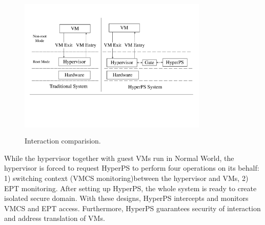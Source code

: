 \documentclass[conference]{IEEEtran}
\begin{document}
\begin{figure}
\centerline{\includegraphics[width=9cm, height=7cm]{HyprpsInteraction.pdf}}
\caption{Interaction comparision. } \label{fig+1}
\end{figure}

While the hypervisor together with guest VMs run in Normal World, the hypervisor is forced to request HyperPS to perform four operations on its behalf: 1) switching context (VMCS monitoring)between the hypervisor and VMs, 2) EPT monitoring. After setting up HyperPS, the whole system is ready to create isolated secure domain. With these designs, HyperPS intercepts and monitors VMCS and EPT access. Furthermore, HyperPS guarantees security of interaction and address translation of VMs.

\end{document}
